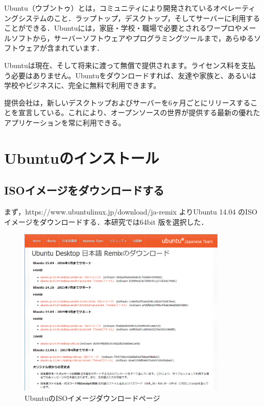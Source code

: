 Ubuntu（ウブントゥ）とは，コミュニティにより開発されているオペレーティングシステムのこと．ラップトップ，デスクトップ，そしてサーバーに利用することができる．Ubuntuには，家庭・学校・職場で必要とされるワープロやメールソフトから，サーバーソフトウェアやプログラミングツールまで，あらゆるソフトウェアが含まれています．

Ubuntuは現在、そして将来に渡って無償で提供されます。ライセンス料を支払う必要はありません。Ubuntuをダウンロードすれば、友達や家族と、あるいは学校やビジネスに、完全に無料で利用できます。

提供会社は，新しいデスクトップおよびサーバーを6ヶ月ごとにリリースすることを宣言している。これにより、オープンソースの世界が提供する最新の優れたアプリケーションを常に利用できる。


\clearpage

\section{Ubuntuのインストール}

\subsection{ISOイメージをダウンロードする}

まず，https://www.ubuntulinux.jp/download/ja-remix よりUbuntu 14.04 のISO イメージをダウンロードする．本研究では64bit 版を選択した．



\begin{figure}[H]
\centering
\includegraphics[width=10cm]{UbuntuDL.png}
\caption{UbuntuのISOイメージダウンロードページ}\label{サンプル図}
\end{figure}






